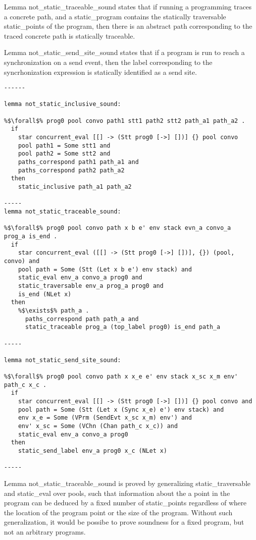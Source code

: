 \documentclass{article}
\begin{document}
Lemma not\_static\_traceable\_sound states that if running a programming traces a concrete
path, and a static\_program contains the statically traversable static\_points of the program, then there is an
abstract path corresponding to the traced concrete path is statically traceable.   

Lemma not\_static\_send\_site\_sound states that if a program is run to reach a synchronization on
a send event, then the label corresponding to the syncrhonization expression is statically
identified as a send site.

\begin{lstlisting}[language=logic, style=codestyle1, escapechar=\%]
------

lemma not_static_inclusive_sound:

%$\forall$% prog0 pool convo path1 stt1 path2 stt2 path_a1 path_a2 . 
  if
    star concurrent_eval [[] -> (Stt prog0 [->] [])] {} pool convo
    pool path1 = Some stt1 and 
    pool path2 = Some stt2 and 
    paths_correspond path1 path_a1 and 
    paths_correspond path2 path_a2
  then
    static_inclusive path_a1 path_a2

-----
lemma not_static_traceable_sound:

%$\forall$% prog0 pool convo path x b e' env stack evn_a convo_a prog_a is_end .
  if
    star concurrent_eval ([[] -> (Stt prog0 [->] [])], {}) (pool, convo) and 
    pool path = Some (Stt (Let x b e') env stack) and 
    static_eval env_a convo_a prog0 and 
    static_traversable env_a prog_a prog0 and 
    is_end (NLet x)
  then
    %$\exists$% path_a . 
      paths_correspond path path_a and 
      static_traceable prog_a (top_label prog0) is_end path_a

-----

lemma not_static_send_site_sound:

%$\forall$% prog0 pool convo path x x_e e' env stack x_sc x_m env' path_c x_c .
  if
    star concurrent_eval [[] -> (Stt prog0 [->] [])] {} pool convo and 
    pool path = Some (Stt (Let x (Sync x_e) e') env stack) and 
    env x_e = Some (VPrm (SendEvt x_sc x_m) env') and 
    env' x_sc = Some (VChn (Chan path_c x_c)) and 
    static_eval env_a convo_a prog0
  then 
    static_send_label env_a prog0 x_c (NLet x)

-----

\end{lstlisting}

Lemma not\_static\_traceable\_sound is proved by generalizing static\_traversable and static\_eval
over pools, such that information about the a point in the program can be deduced by a fixed
number of static\_points regardless of where the location of the program point or the size of the
program.  Without such generalization, it would be possibe to prove soundness for a fixed
program, but not an arbitrary programs.
\end{document}
